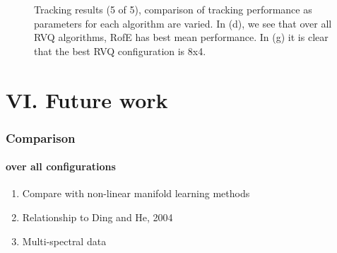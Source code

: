 \begin{frame}
\begin{figure}[h!]
\caption{Tracking results (5 of 5), comparison of tracking performance as parameters for each algorithm are varied.  In (d), we see that over all RVQ algorithms, RofE has best mean performance.  In (g) it is clear that the best RVQ configuration is 8x4.}
\label{fig:results_final_5_configs}
\end{figure}
\end{frame}


\section{VI. Future work}
\begin{frame}
\frametitle{Comparison}
\framesubtitle{over all configurations}
\logoCSIPCPL\mypagenum
\setcounter{subfigure}{0}
\begin{enumerate}
\item Compare with non-linear manifold learning methods
\item Relationship to Ding and He, 2004
\item Multi-spectral data
\end{enumerate}
\end{frame}

